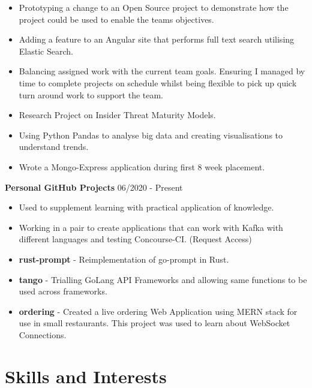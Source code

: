 \documentclass{article}
\begin{document}
\begin{multicols}{2}
\begin{itemize}
\itemsep0em
	\item Prototyping a change to an Open Source project to demonstrate how the project could be used to enable the teams objectives.
	\item Adding a feature to an Angular site that performs full text search utilising Elastic Search.
	\item Balancing assigned work with the current team goals. Ensuring I managed by time to complete projects on schedule whilst being flexible to pick up quick turn around work to support the team.
	\item Research Project on Insider Threat Maturity Models.
	\item Using Python Pandas to analyse big data and creating visualisations to understand trends.
	\item Wrote a Mongo-Express application during first 8 week placement.
\end{itemize}
\end{multicols}

\textbf{Personal GitHub Projects} \hfill 06/2020 - Present

\begin{multicols}{2}
\begin{itemize}
\itemsep0em
	\item Used to supplement learning with practical application of knowledge.
	\item Working in a pair to create applications that can work with Kafka with different languages and testing Concourse-CI. (Request Access)
	\item \textbf{rust-prompt} - Reimplementation of go-prompt in Rust.
	\item \textbf{tango} - Trialling GoLang API Frameworks and allowing same functions to be used across frameworks.
	\item \textbf{ordering} - Created a live ordering Web Application using MERN stack for use in small restaurants. This project was used to learn about WebSocket Connections.
\end{itemize}
\end{multicols}

\clearpage

\section*{Skills and Interests}
\end{document}
